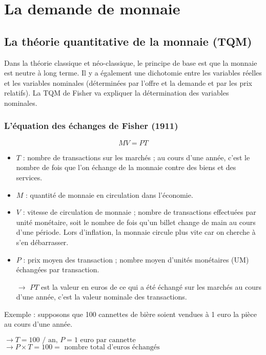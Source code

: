 \chapter{La demande de monnaie}

\section{La théorie quantitative de la monnaie (TQM)}

	Dans la théorie classique et néo-classique, le principe de base est que la monnaie est neutre à long terme. Il y a également une dichotomie entre les variables réelles et les variables nominales (déterminées par l'offre et la demande et par les prix relatifs). La TQM de Fisher va expliquer la détermination des variables nominales.
	
	\subsection{L'équation des échanges de Fisher (1911)}
	
	$$MV = PT$$
	
	\begin{itemize}
		\item $T$ : nombre de transactions sur les marchés  ; au cours d'une année, c'est le nombre de fois que l'on échange de la monnaie contre des biens et des services.
		\item $M$ : quantité de monnaie en circulation dans l'économie.
		\item $V$ : vitesse de circulation de monnaie ; nombre de transactions effectuées par unité monétaire, soit le nombre de fois qu'un billet change de main au cours d'une période. Lors d'inflation, la monnaie circule plus vite car on cherche à s'en débarrasser.
		\item $P$ : prix moyen des transaction ; nombre moyen d'unités monétaires (UM) échangées par transaction.
		
		$\rightarrow$ $PT$ est la valeur en euros de ce qui a été échangé sur les marchés au cours d'une année, c'est la valeur nominale des transactions.
	\end{itemize}
	
	Exemple : supposons que 100 cannettes de bière soient vendues à 1 euro la pièce au cours d'une année.
	
	$\rightarrow T = 100\text{ / an, } P = 1 \text{ euro par cannette}$
	$\rightarrow P \times T = 100 = \text{ nombre total d'euros échangés}$
	
